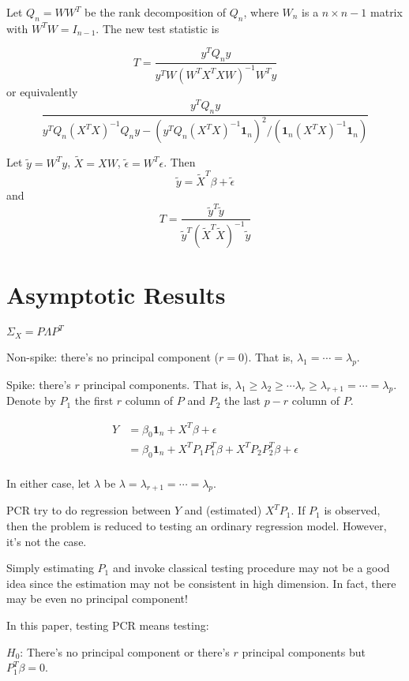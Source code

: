 \documentclass[review]{elsarticle}
\theoremstyle{plain}
\theoremstyle{definition}
\theoremstyle{remark}
\begin{document}
Let $Q_n=WW^T$ be the rank decomposition of $Q_n$, where $W_n$ is a $n\times n-1$ matrix with $W^T W=I_{n-1}$. The new test statistic is

\[
    T=\frac{y^T Q_n y}{
        y^T W{(W^T X^T X W)}^{-1}W^T y
    } 
    \]
or equivalently
\[
    \frac{y^T Q_n y}{
        y^T Q_n{(X^T X)}^{-1}Q_n y-{(y^T Q_n{(X^T X)}^{-1}\textbf{1}_n)}^2/(\textbf{1}_n{(X^T X)}^{-1}\textbf{1}_n)
    } 
    \]


Let $\tilde{y}=W^T y$, $\tilde{X}=XW$, $\tilde{\epsilon}=W^T \epsilon$. Then
\[
    \tilde{y}=\tilde{X}^T \beta + \tilde{\epsilon}
    \]
and
\[
    T=\frac{\tilde{y}^T \tilde{y}}{
        \tilde{y}^T{(\tilde{X}^T \tilde{X})}^{-1}\tilde{y}
    }
    \]

\section{Asymptotic Results}

$\Sigma_X=P\Lambda P^T$

Non-spike: there's no principal component ($r=0$). That is, $\lambda_1=\cdots = \lambda_p$.

Spike: there's $r$ principal components. That is, $\lambda_1\geq \lambda_2\geq \cdots \lambda_r\geq \lambda_{r+1}=\cdots =\lambda_p$. Denote by $P_1$ the first $r$ column of $P$ and $P_2$ the last $p-r$ column of $P$.

\begin{equation}
    \begin{aligned}
        Y&=\beta_0 \textbf{1}_n+X^T\beta+\epsilon\\
        &=\beta_0 \textbf{1}_n+X^T P_1P_1^T\beta+X^T P_2 P_2^T\beta+\epsilon\\
    \end{aligned}
\end{equation}

In either case, let $\lambda$ be $\lambda=\lambda_{r+1}=\cdots=\lambda_{p}$.

PCR try to do regression between $Y$ and (estimated) $X^T P_1$. If $P_1$ is observed, then the problem is reduced to testing an ordinary regression model. However, it's not the case.

Simply estimating $P_1$ and invoke classical testing procedure may not be a good idea since the estimation may not be consistent in high dimension. In fact, there may be even no principal component!

In this paper, testing PCR means testing:

$H_0$: There's no principal component or there's $r$ principal components but $P_1^T \beta =0$.
\end{document}
